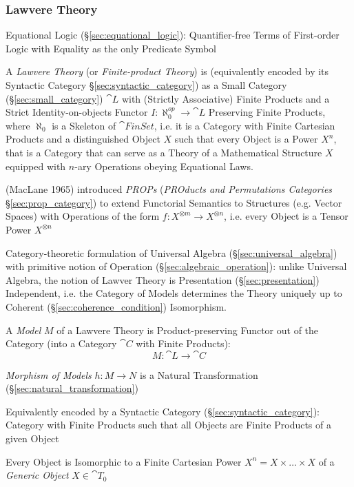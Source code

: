 \subsubsection{Lawvere Theory}\label{sec:lawvere_theory}

\fist Equational Logic (\S\ref{sec:equational_logic}): Quantifier-free Terms of
First-order Logic with Equality as the only Predicate Symbol

A \emph{Lawvere Theory} (or \emph{Finite-product Theory}) is (equivalently
encoded by its Syntactic Category \S\ref{sec:syntactic_category}) as a Small
Category (\S\ref{sec:small_category}) $\cat{L}$ with (Strictly Associative)
Finite Products and a Strict Identity-on-objects Functor $I : \aleph_0^{op}
\rightarrow \cat{L}$ Preserving Finite Products, where $\aleph_0$ is a Skeleton
of $\cat{FinSet}$, i.e. it is a Category with Finite Cartesian Products and a
distinguished Object $X$ such that every Object is a Power $X^n$, that is a
Category that can serve as a Theory of a Mathematical Structure $X$ equipped
with $n$-ary Operations obeying Equational Laws.

\fist (MacLane 1965) introduced \emph{PROPs} (\emph{PROducts and Permutations
  Categories} \S\ref{sec:prop_category}) to extend Functorial Semantics to
Structures (e.g. Vector Spaces) with Operations of the form $f : X^{\otimes m}
\rightarrow X^{\otimes n}$, i.e. every Object is a Tensor Power $X^{\otimes n}$

Category-theoretic formulation of Universal Algebra
(\S\ref{sec:universal_algebra}) with primitive notion of Operation
(\S\ref{sec:algebraic_operation}): unlike Universal Algebra, the notion of
Lawver Theory is Presentation (\S\ref{sec:presentation}) Independent, i.e. the
Category of Models determines the Theory uniquely up to Coherent
(\S\ref{sec:coherence_condition}) Isomorphism. \cite{hyland-power06}

A \emph{Model} $M$ of a Lawvere Theory is Product-preserving Functor out of the
Category (into a Category $\cat{C}$ with Finite Products):
\[
  M : \cat{L} \rightarrow \cat{C}
\]

\emph{Morphism of Models} $h : M \rightarrow N$ is a Natural Transformation
(\S\ref{sec:natural_transformation})

Equivalently encoded by a Syntactic Category (\S\ref{sec:syntactic_category}):
Category with Finite Products such that all Objects are Finite Products of a
given Object

Every Object is Isomorphic to a Finite Cartesian Power $X^n = X \times \ldots
\times X$ of a \emph{Generic Object} $X \in \cat{T}_0$


